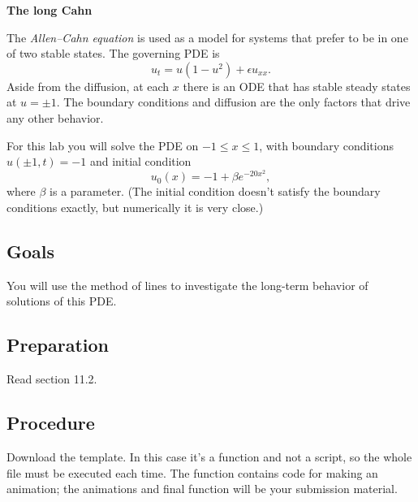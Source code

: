\documentclass[11pt,twoside]{fncextra}
\begin{document}
    
\begin{center}
  \bf The long Cahn
\end{center}

The \emph{Allen--Cahn equation} is used as a model for systems that prefer to be in one of two stable states. The governing PDE is
\begin{equation}
  \label{eq:1}
  u_t = u(1-u^2) + \epsilon u_{xx}.
\end{equation}
Aside from the diffusion, at each $x$ there is an ODE that has stable steady states at $u=\pm 1$. The boundary conditions and diffusion are the only factors that drive any other behavior.

For this lab you will solve the PDE on $-1\le x \le 1$, with boundary conditions $u(\pm 1,t) = -1$ and initial condition
\begin{equation}
  \label{eq:2}
  u_0(x) = -1 + \beta e^{-20x^2},
\end{equation}
where $\beta$ is a parameter. (The initial condition doesn't satisfy the boundary conditions exactly, but numerically it is very close.)

\subsection*{Goals}
    
You will use the method of lines to investigate the long-term behavior of solutions of this PDE.

\subsection*{Preparation}

Read section 11.2.

\subsection*{Procedure}

Download the template. In this case it's a function and not a script, so the whole file must be executed each time. The function contains code for making an animation; the animations and final function will be your submission material.
\end{document}
